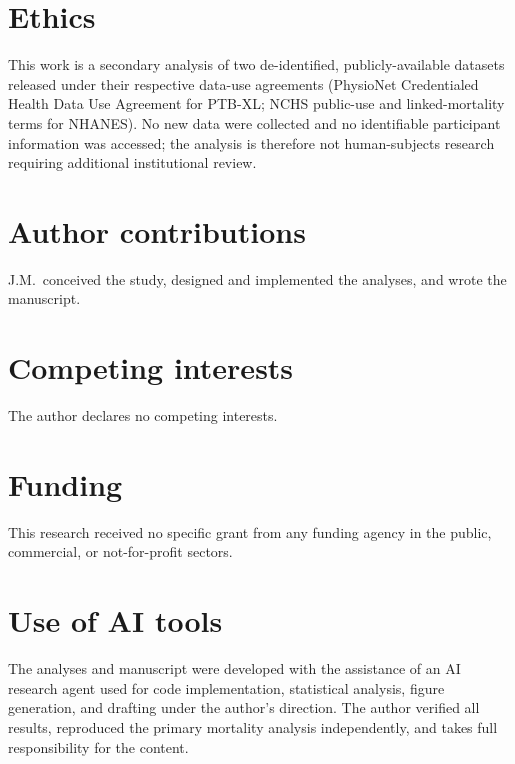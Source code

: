 \documentclass[11pt]{article}
\begin{document}
\section*{Ethics}
This work is a secondary analysis of two de-identified, publicly-available datasets released
under their respective data-use agreements (PhysioNet Credentialed Health Data Use Agreement for
PTB-XL; NCHS public-use and linked-mortality terms for NHANES). No new data were collected and
no identifiable participant information was accessed; the analysis is therefore not human-subjects
research requiring additional institutional review.

\section*{Author contributions}
J.M.\ conceived the study, designed and implemented the analyses, and wrote the manuscript.

\section*{Competing interests}
The author declares no competing interests.

\section*{Funding}
This research received no specific grant from any funding agency in the public, commercial, or
not-for-profit sectors.

\section*{Use of AI tools}
The analyses and manuscript were developed with the assistance of an AI research agent used for
code implementation, statistical analysis, figure generation, and drafting under the author's
direction. The author verified all results, reproduced the primary mortality analysis
independently, and takes full responsibility for the content.



\end{document}
